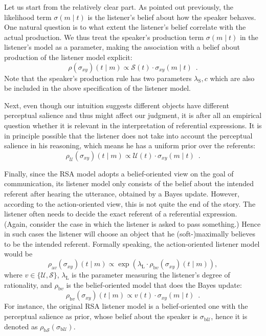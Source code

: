 Let us start from the relatively clear part. As pointed out previously, the likelihood term $\sigma(m \mid t)$ is the listener's belief about how the speaker behaves. One natural question is to what extent the listener's belief correlate with the actual production. We thus treat the speaker's production term $\sigma(m \mid t)$ in the listener's model as a parameter, making the association with a belief about production of the listener model explicit:
\begin{equation} \label{listener-production}
\rho(\sigma_{xy})(t \mid m) \propto \mathcal{S}(t)\cdot \sigma_{xy}(m \mid t) \enspace .
\end{equation}
Note that the speaker's production rule has two parameters $\lambda_\mathrm{S},c$ which are also be included in the above specification of the listener model.

Next, even though our intuition suggests different objects have different perceptual salience and thus might affect our judgment, it is after all an empirical question whether it is relevant in the interpretation of referential expressions. It is in principle possible that the listener does not take into account the perceptual salience in his reasoning, which means he has a uniform prior over the referents:
\begin{equation} \label{listener-production-uniform}
\rho_{\mathcal{U}}(\sigma_{xy})(t \mid m) \propto \mathcal{U}(t)\cdot \sigma_{xy}(m \mid t) \enspace .
\end{equation}

Finally, since the RSA model adopts a belief-oriented view on the goal of communication, its listener model only consists of the belief about the intended referent after hearing the utterance, obtained by a Bayes update. However, according to the action-oriented view, this is not quite the end of the story. The listener often needs to decide the exact referent of a referential expression. (Again, consider the case in which the listener is asked to pass something.) Hence in such cases the listener will choose an object that he (soft-)maximally believes to be the intended referent. Formally speaking, the action-oriented listener model would be
\begin{equation} \label{listener-action}
\rho_{\mathrm{a}v}(\sigma_{xy})(t \mid m) \propto \exp(\lambda_\mathrm{L} \cdot \rho_{\mathrm{b}v}(\sigma_{xy})(t \mid m) ),
\end{equation}
where $v\in\{\mathcal{U},\mathcal{S}\}$, $\lambda_\mathrm{L}$ is the parameter measuring the listener's degree of rationality, and $\rho_{\mathrm{b}v}$ is the belief-oriented model that does the Bayes update:
\begin{equation} \label{listener-belief}
\rho_{\mathrm{b}v}(\sigma_{xy})(t \mid m) \propto v(t)\cdot \sigma_{xy}(m \mid t) \enspace .
\end{equation}
For instance, the original RSA listener model is a belief-oriented one with the perceptual salience as prior, whose belief about the speaker is $\sigma_{\mathrm{b}\mathcal{U}}$, hence it is denoted as $\rho_{\mathrm{b}\mathcal{S}}(\sigma_{\mathrm{b}\mathcal{U}})$.


